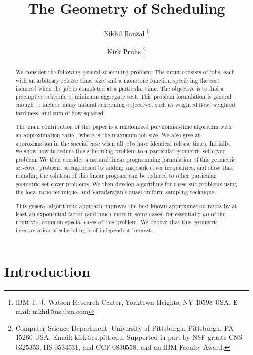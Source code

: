 \documentclass[11pt]{article}
\begin{document}
\title{The Geometry of Scheduling}
\author{
Nikhil Bansal
\thanks{IBM T. J. Watson Research Center,
Yorktown Heights, NY 10598 USA.
E-mail: nikhil@us.ibm.com}
\and
 Kirk Pruhs 
 \thanks{
Computer Science Department, 
University of Pittsburgh, 
Pittsburgh, PA 15260 USA.
Email: kirk@cs.pitt.edu.
Supported in part by
NSF grants CNS-0325353,  IIS-0534531, and CCF-0830558, and
an IBM Faculty Award.} 
} 
\date{}
\maketitle

\begin{abstract}
We consider the following general scheduling problem: 
The input consists of  jobs, each with an arbitrary release time,
size, and a monotone function 
specifying the cost incurred when the job is completed at a particular time.
The objective is to find a preemptive schedule of minimum aggregate cost.
This problem formulation is general enough to include many natural scheduling 
objectives, such as weighted flow, weighted tardiness, and sum of flow squared.

The main contribution of this paper 
is a randomized polynomial-time algorithm with an approximation ratio 
,
where  is the maximum job size.
We also give an  approximation in the special case when all jobs have identical release times.
Initially, we show how to reduce this scheduling problem
to a particular geometric set-cover problem.
We then consider a natural linear programming formulation of this geometric set-cover problem, 
strengthened by adding knapsack cover inequalities,
and show that rounding the solution of this linear program can be reduced to 
other particular geometric set-cover problems.
We then develop algorithms for these sub-problems using the local ratio technique,
and Varadarajan's quasi-uniform sampling technique.

This general algorithmic approach improves the best known approximation ratios by at least an 
exponential factor (and much more in some cases) for essentially 
{\em all} of the nontrivial common special cases of this problem.
We believe that this geometric interpretation of scheduling 
is of independent interest.
\end{abstract}



\section{Introduction}
\end{document}
